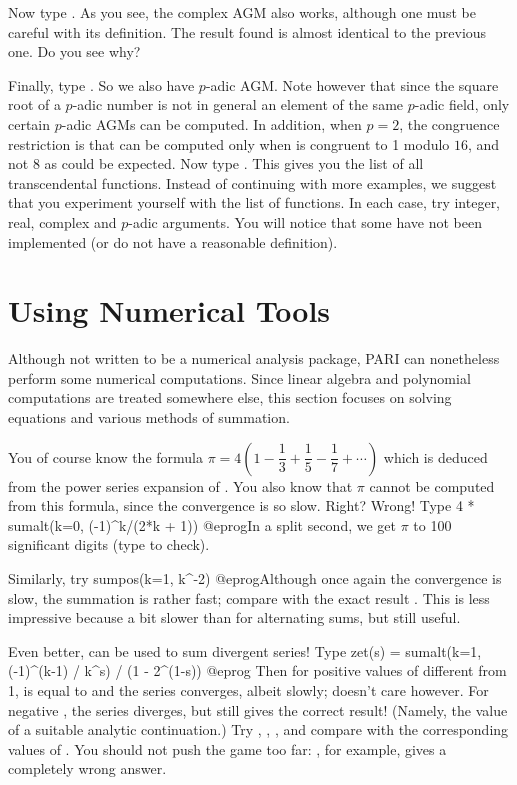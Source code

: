 Now type . As you see, the complex AGM also works,
although one must be careful with its definition. The result found is
almost identical to the previous one. Do you see why?

Finally, type . So we also have $p$-adic
AGM. Note however that since the square root of a $p$-adic number is not
in general an element of the same $p$-adic field,
only certain $p$-adic AGMs can be computed. In addition,
when $p=2$, the congruence restriction is that  can be computed
only when  is congruent to 1 modulo $16$, and not 8 as could be
expected.\smallskip
%
Now type . This gives you the list of all transcendental functions.
Instead of continuing with more examples, we suggest that you experiment
yourself with the list of functions. In each case, try integer, real, complex
and $p$-adic arguments. You will notice that some have not been implemented
(or do not have a reasonable definition).

\section{Using Numerical Tools}

 Although not written to be a numerical analysis package, PARI can
nonetheless perform some numerical computations. Since linear algebra and
polynomial computations are treated somewhere else, this section focuses on
solving equations and various methods of summation.

You of course know the formula $\pi = 4(1-\dfrac13+\dfrac15-\dfrac17+\cdots)$
which is deduced from the power series expansion of . You also
know that $\pi$ cannot be computed from this formula, since the convergence
is so slow. Right? Wrong! Type
\bprog
  4 * sumalt(k=0, (-1)^k/(2*k + 1))
@eprog\noindent In a split second, we get $\pi$ to 100 significant digits
(type  to check).

Similarly, try
\bprog
  sumpos(k=1, k^-2)
@eprog\noindent Although once again the convergence is slow, the summation is
rather fast; compare with the exact result . This is less
impressive because a bit slower than for alternating sums, but still useful.

Even better,  can be used to sum divergent series! Type
\bprog
  zet(s) = sumalt(k=1, (-1)^(k-1) / k^s) / (1 - 2^(1-s))
@eprog\noindent
Then for positive values of  different from 1,  is equal
to  and the series converges, albeit slowly; 
doesn't care however. For negative , the series diverges, but
 still gives the correct result! (Namely, the value of a suitable
analytic continuation.) Try , , ,
and compare with the corresponding values of . You should not push
the game too far: , for example, gives a completely wrong
answer.

